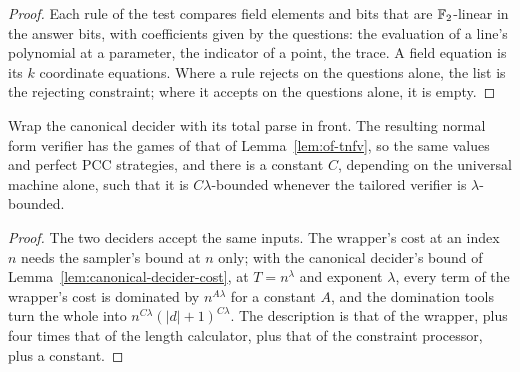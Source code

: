 \begin{proof}
\leanok
Each rule of the test compares field elements and bits that are $\mathbb{F}_2$-linear in the answer bits,
with coefficients given by the questions: the evaluation of a line's polynomial at a parameter,
the indicator of a point, the trace. A field equation is its $k$ coordinate equations. Where a
rule rejects on the questions alone, the list is the rejecting constraint; where it accepts on
the questions alone, it is empty.
\end{proof}

\begin{lemma}
\label{lem:of-tnfvt}
\leanok
Wrap the canonical decider with its total parse in front. The resulting normal form verifier has
the games of that of Lemma~\ref{lem:of-tnfv}, so the same values and perfect PCC strategies, and
there is a constant $C$, depending on the universal machine alone, such that it is
$C\lambda$-bounded whenever the tailored verifier is $\lambda$-bounded.
\end{lemma}

\begin{proof}
\leanok
The two deciders accept the same inputs. The wrapper's cost at an index $n$ needs the sampler's
bound at $n$ only; with the canonical decider's bound of Lemma~\ref{lem:canonical-decider-cost},
at $T = n^\lambda$ and exponent $\lambda$, every term of the wrapper's cost is dominated by
$n^{A\lambda}$ for a constant $A$, and the domination tools turn the whole into
$n^{C\lambda}(|d|+1)^{C\lambda}$. The description is that of the wrapper, plus four times that of
the length calculator, plus that of the constraint processor, plus a constant.
\end{proof}

